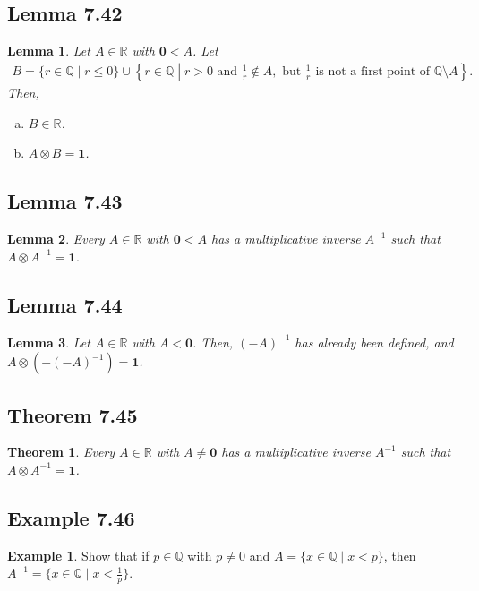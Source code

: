 \documentclass[openany, amssymb, psamsfonts]{amsart}
\newcommand{\bbQ}{\mathbb{Q}}
\newcommand{\bbR}{\mathbb{R}}
\newtheorem{thm}{Theorem}[section]
\newtheorem{lem}{Lemma}[section]
\theoremstyle{definition}
\newtheorem{exmp}{Example}[section]
\numberwithin{equation}{section}
\begin{document}
\subsection*{Lemma 7.42}
\begin{lem}
\label{7.42}
	Let $A\in\bbR$ with $\mathbf{0}<A$. Let
	\begin{align*}
		B = \{r \in \bbQ \mid r \leq 0\} \cup \left\{r \in \bbQ \mathrel{}\middle|\mathrel{} r > 0\text{ and }\frac{1}{r} \notin A, \text{ but } \frac{1}{r} \text{ is not a first point of }\bbQ \setminus A\right\}.
	\end{align*}
	Then,
	\begin{enumerate}[(a)]
		\item $B \in \bbR$.
		\item $A \otimes B = \mathbf{1}$.
	\end{enumerate}
\end{lem}

\subsection*{Lemma 7.43}
\begin{lem}
\label{7.43}
	Every $A \in \bbR$ with $\mathbf{0} < A$ has a multiplicative inverse $A^{-1}$ such that $A \otimes A^{-1} = \mathbf{1}$.
\end{lem}

\subsection*{Lemma 7.44}
\begin{lem}
\label{7.44}
	Let $A \in \bbR$ with $A < \mathbf{0}$. Then, $(-A)^{-1}$ has already been defined, and $A \otimes (-(-A)^{-1}) = \mathbf{1}$.
\end{lem}

\subsection*{Theorem 7.45}
\begin{thm}
\label{7.45}
	Every $A \in \bbR$ with $A \neq \mathbf{0}$ has a multiplicative inverse $A^{-1}$ such that $A \otimes A^{-1} = \mathbf{1}$. 
\end{thm}

\subsection*{Example 7.46}
\begin{exmp}
\label{7.46}
	Show that if $p \in \bbQ$ with $p \neq 0$ and $A= \{x \in \bbQ \mid x < p\}$, then $A^{-1} = \{x \in \bbQ \mid x < \frac{1}{p}\}$.
\end{exmp}
\end{document}
